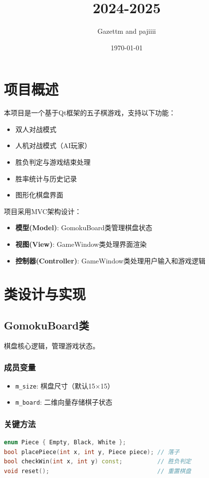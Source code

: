 \documentclass[UTF8]{ctexart}
\title{2024-2025}
\author{Gazettm and pajiiii}
\date{\today}
\begin{document}
\maketitle
\tableofcontents

\section{项目概述}
本项目是一个基于Qt框架的五子棋游戏，支持以下功能：
\begin{itemize}
    \item 双人对战模式
    \item 人机对战模式（AI玩家）
    \item 胜负判定与游戏结束处理
    \item 胜率统计与历史记录
    \item 图形化棋盘界面
\end{itemize}

项目采用MVC架构设计：
\begin{itemize}
    \item \textbf{模型(Model)}: GomokuBoard类管理棋盘状态
    \item \textbf{视图(View)}: GameWindow类处理界面渲染
    \item \textbf{控制器(Controller)}: GameWindow类处理用户输入和游戏逻辑
\end{itemize}

\section{类设计与实现}
\subsection{GomokuBoard类}
棋盘核心逻辑，管理游戏状态。

\subsubsection{成员变量}
\begin{itemize}
    \item \texttt{m\_size}: 棋盘尺寸（默认15×15）
    \item \texttt{m\_board}: 二维向量存储棋子状态
\end{itemize}

\subsubsection{关键方法}
\begin{lstlisting}[language=C++, caption=gomokuboard.h]
enum Piece { Empty, Black, White };
bool placePiece(int x, int y, Piece piece); // 落子
bool checkWin(int x, int y) const;          // 胜负判定
void reset();                               // 重置棋盘
\end{lstlisting}
\end{document}

